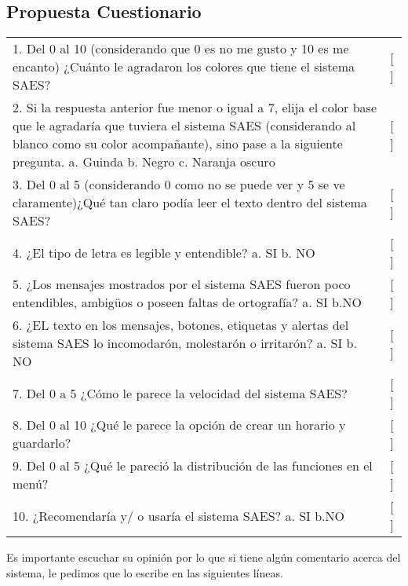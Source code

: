 \subsection{Propuesta Cuestionario}
\begin{longtable}{p{15cm} p{1cm}}
    1. Del 0 al 10 (considerando que 0 es no me gusto y 10 es me encanto) ¿Cuánto le agradaron los colores que tiene el sistema SAES?
    &
    [  ]\\
    2. Si la respuesta anterior fue menor o igual a 7, elija el color base que le agradaría que tuviera el sistema SAES (considerando al blanco como su color acompañante), sino pase a la siguiente pregunta.\newline
    a. Guinda  \hspace{2cm} b. Negro  \hspace{2cm} c. Naranja oscuro
    &
    [  ]\\
    3. Del 0 al 5 (considerando 0 como no se puede ver y 5 se ve claramente)¿Qué tan claro podía leer el texto dentro del sistema SAES?
    &
    [  ]\\
    4. ¿El tipo de letra es legible y entendible?\newline
    a. SI   \hspace{2cm} b. NO
    &
    [  ]\\
    5. ¿Los mensajes mostrados por el sistema SAES fueron poco entendibles, ambigüos o poseen faltas de ortografía? \newline
    a. SI \hspace{2cm}  b.NO
    &
    [  ]\\
    6. ¿EL texto en los mensajes, botones, etiquetas y alertas del sistema SAES lo incomodarón, molestarón o irritarón? \newline
    a. SI \hspace{2cm}  b. NO
    &
    [  ]\\
    7. Del 0 a 5 ¿Cómo le parece la velocidad del sistema SAES?  & [  ]\\
    8. Del 0 al 10 ¿Qué le parece la opción de crear un horario y guardarlo? & [  ]\\
    9. Del 0 al 5 ¿Qué le pareció la distribución de las funciones en el menú? & [  ]\\
    10. ¿Recomendaría y/ o usaría el sistema SAES? \newline a. SI \hspace{2cm} b.NO &  [  ]\\ 
\end{longtable}
\vspace*{2cm}
\noindent
Es importante escuchar su opinión por lo que si tiene algún comentario acerca del sistema, le pedimos que lo escribe en las siguientes líneas.
\begin{longtable}{ |p{15cm}| }
\hline
    \vspace*{5cm} \\
\hline
\end{longtable}